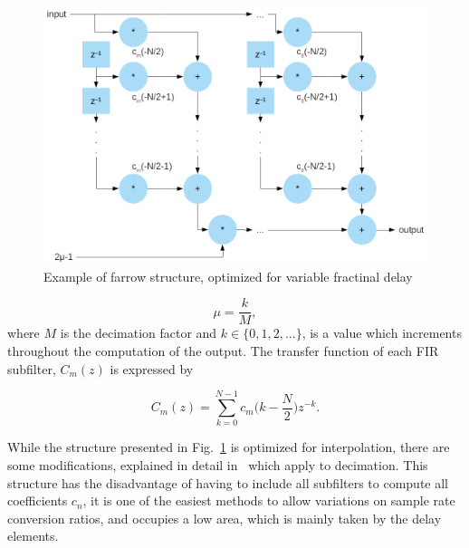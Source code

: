 \begin{figure}[!htb]
  \centering
  \includegraphics[width=\textwidth]{Figures/farrow_struct.png}
  \caption{Example of farrow structure, optimized for variable fractinal delay}
  \label{fig:farrow_structure}
\end{figure}


\begin{equation}
	\mu = \frac{k}{M},
	\label{eq:mu_farrow}
\end{equation}
where $M$ is the decimation factor and $k \in \{0,1,2,...\}$, is a value which
increments throughout the computation of the output. The transfer function of
each FIR subfilter, $C_m (z)$ is expressed by

\begin{equation}
	C_m (z) = \sum_{k=0}^{N-1}c_m \bigg(k-\frac{N}{2}\bigg)z^{-k} .
	\label{eq:farrow_sub_transferfunc}
\end{equation}

While the structure presented in Fig.~\ref{fig:farrow_structure} is optimized
for interpolation, there are some modifications, explained in detail
in~\cite{babic:farrow_optimization} which apply to decimation. This structure has
the disadvantage of having to include all subfilters to compute all coefficients
$c_n$, it is one of the easiest methods to allow variations on sample rate
conversion ratios, and occupies a low area, which is mainly taken by the delay
elements.
